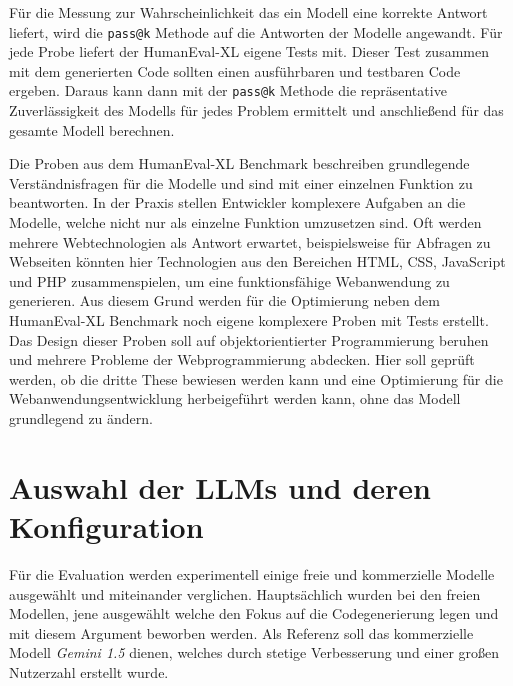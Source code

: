 Für die Messung zur Wahrscheinlichkeit das ein Modell eine korrekte Antwort liefert, wird die \texttt{pass@k} Methode auf die Antworten der Modelle angewandt. Für jede Probe liefert der HumanEval-XL eigene Tests mit. Dieser Test zusammen mit dem generierten Code sollten einen ausführbaren und testbaren Code ergeben. Daraus kann dann mit der \texttt{pass@k} Methode die repräsentative Zuverlässigkeit des Modells für jedes Problem ermittelt und anschließend für das gesamte Modell berechnen.\vspace{0.2cm}

Die Proben aus dem HumanEval-XL Benchmark beschreiben grundlegende Verständnisfragen für die Modelle und sind mit einer einzelnen Funktion zu beantworten. In der Praxis stellen Entwickler komplexere Aufgaben an die Modelle, welche nicht nur als einzelne Funktion umzusetzen sind. Oft werden mehrere Webtechnologien als Antwort erwartet, beispielsweise für Abfragen zu Webseiten könnten hier Technologien aus den Bereichen HTML, CSS, JavaScript und PHP zusammenspielen, um eine funktionsfähige Webanwendung zu generieren. Aus diesem Grund werden für die Optimierung neben dem HumanEval-XL Benchmark noch eigene komplexere Proben mit Tests erstellt. Das Design dieser Proben soll auf objektorientierter Programmierung beruhen und mehrere Probleme der Webprogrammierung abdecken. Hier soll geprüft werden, ob die dritte These bewiesen werden kann und eine Optimierung für die Webanwendungsentwicklung herbeigeführt werden kann, ohne das Modell grundlegend zu ändern.



\section{Auswahl der LLMs und deren Konfiguration}\label{subsec:llm_selection}

Für die Evaluation werden experimentell einige freie und kommerzielle Modelle ausgewählt und miteinander verglichen. Hauptsächlich wurden bei den freien Modellen, jene ausgewählt welche den Fokus auf die Codegenerierung legen und mit diesem Argument beworben werden. Als Referenz soll das kommerzielle Modell \textit{Gemini 1.5} dienen, welches durch stetige Verbesserung und einer großen Nutzerzahl erstellt wurde.\vspace{0.2cm}

